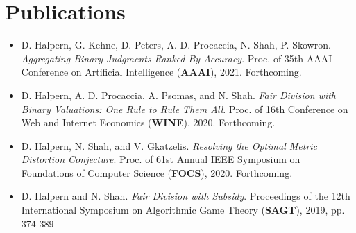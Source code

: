 \documentclass{article}
\begin{document}
    \section{Publications}
    \begin{itemize}
        \setlength\itemsep{1.3ex}
        \item D. Halpern, G. Kehne, D. Peters, A. D. Procaccia, N. Shah, P. Skowron. \textit{Aggregating Binary Judgments Ranked By Accuracy}.
        Proc. of 35th AAAI Conference on Artificial Intelligence (\textbf{AAAI}), 2021. Forthcoming.

        \item D. Halpern, A. D. Procaccia, A. Psomas, and N. Shah. \textit{Fair Division with Binary Valuations: One
        Rule to Rule
        Them All}. Proc. of 16th Conference on Web and Internet Economics (\textbf{WINE}), 2020. Forthcoming.

        \item D. Halpern, N. Shah, and V. Gkatzelis. \textit{Resolving the Optimal Metric Distortion Conjecture}.
        Proc. of 61st Annual IEEE Symposium on Foundations of Computer Science (\textbf{FOCS}), 2020. Forthcoming.

        \item D. Halpern and N. Shah. \textit{Fair Division with Subsidy}. Proceedings of the 12th International Symposium on
        Algorithmic Game Theory (\textbf{SAGT}), 2019, pp. 374-389

    \end{itemize}
\end{document}
